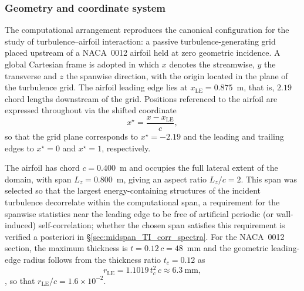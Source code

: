 \documentclass[lineno]{JFM-FLM_Au}
\begin{document}

\subsubsection{Geometry and coordinate system}

The computational arrangement reproduces the canonical configuration for
the study of turbulence--airfoil interaction: a passive
turbulence-generating grid placed upstream of a NACA~0012 airfoil held at
zero geometric incidence. A global Cartesian frame is adopted in which
$x$ denotes the streamwise, $y$ the transverse and $z$ the spanwise
direction, with the origin located in the plane of the turbulence grid.
The airfoil leading edge lies at $x_{\mathrm{LE}} = 0.875$~m, that is,
$2.19$ chord lengths downstream of the grid. Positions referenced to the
airfoil are expressed throughout via the shifted coordinate
\begin{equation}
  x^{\star} = \frac{x - x_{\mathrm{LE}}}{c},
  \label{eq:xstar_def}
\end{equation}
so that the grid plane corresponds to $x^{\star} = -2.19$ and the leading
and trailing edges to $x^{\star} = 0$ and $x^{\star} = 1$, respectively.

The airfoil has chord $c = 0.400$~m and occupies the full lateral extent
of the domain, with span $L_z = 0.800$~m, giving an aspect ratio
$L_z/c = 2$. This span was selected so that the largest energy-containing
structures of the incident turbulence decorrelate within the
computational span, a requirement for the spanwise statistics near the
leading edge to be free of artificial periodic (or wall-induced)
self-correlation; whether the chosen span satisfies this requirement is
verified a posteriori in \S\ref{sec:midspan_TI_corr_spectra}. For the
NACA~0012 section, the maximum thickness is $t = 0.12\,c = 48$~mm and
the geometric leading-edge radius follows from the thickness ratio
$t_c = 0.12$ as
\begin{equation}
  r_{\mathrm{LE}} = 1.1019\,t_c^{2}\,c \approx 6.3~\mathrm{mm},
  \label{eq:rLE_def}
\end{equation}
\citep{AbbottDoenhoff1959}, so that
$r_{\mathrm{LE}}/c = 1.6\times10^{-2}$.
\end{document}
